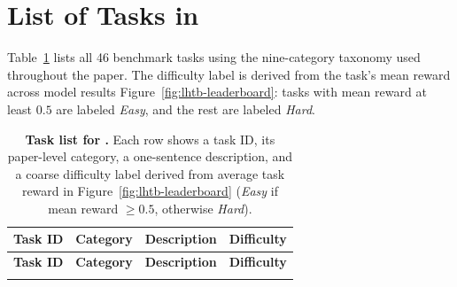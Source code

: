 \section{List of Tasks in \ours{}}
\label{app:task-list}

Table~\ref{tab:lhtb-task-list} lists all 46 benchmark tasks using the nine-category taxonomy used throughout the paper. The difficulty label is derived from the task's mean reward across model results Figure~\ref{fig:lhtb-leaderboard}: tasks with mean reward at least $0.5$ are labeled \emph{Easy}, and the rest are labeled \emph{Hard}.

\small
\setlength{\LTleft}{0pt}
\setlength{\LTright}{0pt}
\begin{longtable}{p{}p{}p{}p{}}
\caption{\textbf{Task list for \ours{}.} Each row shows a task ID, its paper-level category, a one-sentence description, and a coarse difficulty label derived from average task reward in Figure~\ref{fig:lhtb-leaderboard} (\emph{Easy} if mean reward $\geq 0.5$, otherwise \emph{Hard}).}
\label{tab:lhtb-task-list}\\
\toprule
\textbf{Task ID} & \textbf{Category} & \textbf{Description} & \textbf{Difficulty} \\
\midrule
\endfirsthead

\toprule
\textbf{Task ID} & \textbf{Category} & \textbf{Description} & \textbf{Difficulty} \\
\midrule
\endhead

\bottomrule
\endfoot


\end{longtable}
